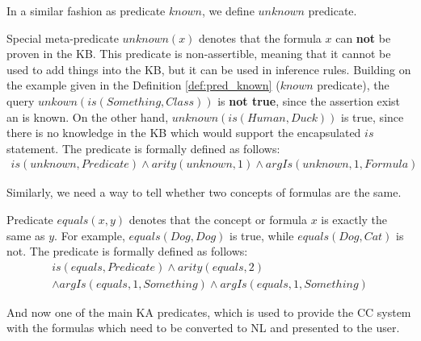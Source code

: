 In a similar fashion as predicate $known$, we define $unknown$ predicate.

\begin{definition}\label{def:pred_unknown}
Special meta-predicate $unknown(x)$ denotes that the formula $x$ can 
\textbf{not} be proven in the KB. This predicate is non-assertible, meaning that it cannot be used to add things into the KB, but it can be used in inference 
rules. Building on the example given in the Definition \ref{def:pred_known}
($known$ predicate), the query $unkown(is(Something,Class))$ is 
\textbf{not true}, since the assertion exist an is known. On the other hand,
$unknown(is(Human,Duck))$ is true, since there is no knowledge in the KB which
would support the encapsulated $is$ statement. The predicate is formally defined as follows:
\begin{equation}\label{as:unknown}
\begin{gathered}
	is(unknown,Predicate) \land arity(unknown,1) \land argIs(unknown,1,Formula)
\end{gathered}
\end{equation}
\end{definition}

Similarly, we need a way to tell whether two concepts of formulas are the same.
\begin{definition}\label{def:pred_equals}
Predicate $equals(x,y)$ denotes that the concept or formula $x$ is exactly 
the same as $y$. For example, $equals(Dog,Dog)$ is true, while 
$equals(Dog,Cat)$ is not. The predicate is formally defined as follows:
\begin{equation}\label{as:equals}
\begin{gathered}
	is(equals,Predicate) \land arity(equals,2)\\
 	\land argIs(equals,1,Something) \land argIs(equals,1,Something)
\end{gathered}
\end{equation}
\end{definition}

And now one of the main KA predicates, which is used to provide the CC system
with the formulas which need to be converted to NL and presented to the user.

